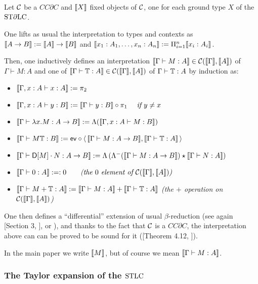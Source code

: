\begin{definition}
Let $\mathcal{C}$ be a $CC\partial C$ and $\llbracket X\rrbracket$ fixed objects of $\mathcal{C}$, one for each ground type $X$ of the $\mathrm{ST}\partial\mathrm{LC}$.

One lifts as usual the interpretation to types and contexts as $\llbracket A\to B\rrbracket:=\llbracket A\rrbracket\to \llbracket B\rrbracket$ and $\llbracket x_1:A_1,\dots,x_n:A_n\rrbracket:=\Pi_{i=1}^n\llbracket x_i:A_i\rrbracket$.

Then, one inductively defines an interpretation $\llbracket\Gamma \vdash M:A\rrbracket\in\mathcal{C}(\llbracket\Gamma\rrbracket,\llbracket A\rrbracket)$ of $\Gamma \vdash M:A$ and one of $\llbracket\Gamma \vdash \mathbb{T}:A\rrbracket\in\mathcal{C}(\llbracket\Gamma\rrbracket,\llbracket A\rrbracket)$ of $\Gamma \vdash \mathbb{T}:A$ by induction as:
\begin{itemize}
 \item $\llbracket\Gamma, x:A \vdash x:A\rrbracket:=\pi_2$
 \item $\llbracket\Gamma, x:A \vdash y:B\rrbracket:=\llbracket\Gamma \vdash y:B\rrbracket\circ \pi_1\quad\textit{ if } y\neq x$
 \item $\llbracket\Gamma\vdash \lambda x.M:A\to B\rrbracket:=\Lambda(\llbracket\Gamma,x:A\vdash M:B\rrbracket)$
 \item $\llbracket\Gamma \vdash M\mathbb{T}:B\rrbracket:=\mathsf{ev} \circ \langle \, \llbracket\Gamma \vdash M:A\to B\rrbracket, \llbracket\Gamma \vdash \mathbb{T}:A\rrbracket \, \rangle$
 \item $\llbracket\Gamma \vdash \mathsf{D} [M] \cdot N:A\to B\rrbracket:=\Lambda\left(\Lambda^-(\llbracket\Gamma \vdash M:A\to B\rrbracket)\star \llbracket\Gamma \vdash N:A\rrbracket\right)$
 \item $\llbracket\Gamma \vdash 0:A\rrbracket:=:0 \qquad \textit{(the $0$ element of $\mathcal{C}(\llbracket\Gamma\rrbracket,\llbracket A\rrbracket)$)}$
 \item $\llbracket\Gamma \vdash M+\mathbb{T}:A\rrbracket:=\llbracket\Gamma \vdash M:A\rrbracket+\llbracket\Gamma \vdash \mathbb{T}:A\rrbracket$ \qquad \textit{(the $+$ operation on $\mathcal{C}(\llbracket\Gamma\rrbracket,\llbracket A\rrbracket)$)}
\end{itemize}
\end{definition}

One then defines a ``differential'' extension of usual $\beta$-reduction (see again [Section 3, \cite{Manzo2010}], or \cite{difflambda}), and thanks to the fact that $\mathcal{C}$ is a $CC\partial C$, the interpretation above can can be proved to be sound for it ([Theorem 4.12, \cite{Manzo2010}]).

In the main paper we write $\llbracket M\rrbracket$, but of course we mean $\llbracket\Gamma \vdash M:A\rrbracket$.

\subsubsection{The Taylor expansion of the $\mathrm{STLC}$}


